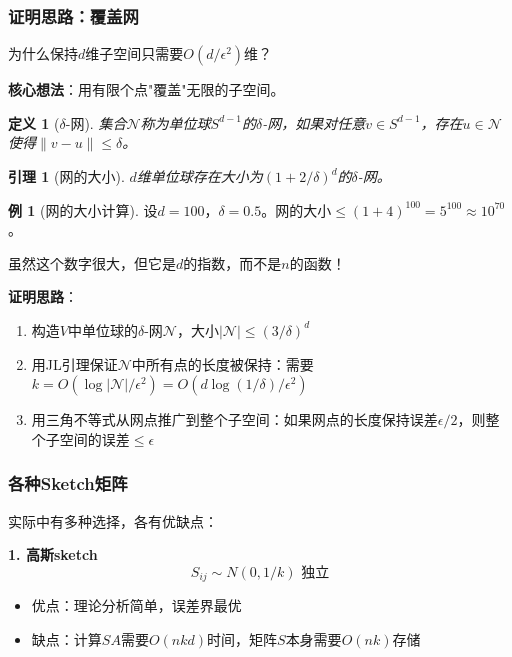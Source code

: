\documentclass[11pt,a4paper]{ctexart}
\newtheorem{lemma}[theorem]{引理}
\newtheorem{definition}[theorem]{定义}
\theoremstyle{definition}
\newtheorem{example}[theorem]{例}
\theoremstyle{remark}
\begin{document}
\subsubsection{证明思路：覆盖网}

为什么保持$d$维子空间只需要$O(d/\epsilon^2)$维？

\textbf{核心想法}：用有限个点"覆盖"无限的子空间。

\begin{definition}[$\delta$-网]
集合$\mathcal{N}$称为单位球$S^{d-1}$的$\delta$-网，如果对任意$v \in S^{d-1}$，存在$u \in \mathcal{N}$使得$\|v - u\| \leq \delta$。
\end{definition}

\begin{lemma}[网的大小]
$d$维单位球存在大小为$(1 + 2/\delta)^d$的$\delta$-网。
\end{lemma}

\begin{example}[网的大小计算]
设$d = 100$，$\delta = 0.5$。网的大小$\leq (1 + 4)^{100} = 5^{100} \approx 10^{70}$。

虽然这个数字很大，但它是$d$的指数，而不是$n$的函数！
\end{example}

\textbf{证明思路}：
\begin{enumerate}
    \item 构造$V$中单位球的$\delta$-网$\mathcal{N}$，大小$|\mathcal{N}| \leq (3/\delta)^d$
    \item 用JL引理保证$\mathcal{N}$中所有点的长度被保持：需要$k = O(\log|\mathcal{N}|/\epsilon^2) = O(d\log(1/\delta)/\epsilon^2)$
    \item 用三角不等式从网点推广到整个子空间：如果网点的长度保持误差$\epsilon/2$，则整个子空间的误差$\leq \epsilon$
\end{enumerate}

\subsubsection{各种Sketch矩阵}

实际中有多种选择，各有优缺点：

\textbf{1. 高斯sketch}
\[
S_{ij} \sim N(0, 1/k) \text{ 独立}
\]
\begin{itemize}
    \item 优点：理论分析简单，误差界最优
    \item 缺点：计算$SA$需要$O(nkd)$时间，矩阵$S$本身需要$O(nk)$存储
\end{itemize}
\end{document}
